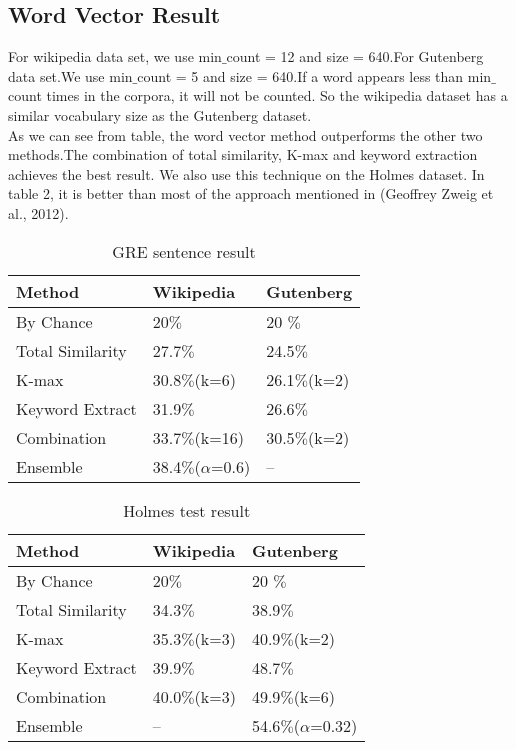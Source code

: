 \documentclass[11pt]{article}
\begin{document}
\subsection{Word Vector Result}
For wikipedia data set, we use min$\_$count = 12 and size = 640.For Gutenberg data set.We use min$\_$count = 5 and size = 640.If a word appears less than min$\_$count times in the corpora, it will not be counted. So the wikipedia dataset has a similar vocabulary size as the Gutenberg dataset.\\
As we can see from table, the word vector method outperforms the other two methods.The combination of total similarity, K-max and keyword extraction achieves the best result. We also use this technique on the Holmes dataset. In table 2, it is better than most of the approach mentioned in (Geoffrey Zweig et al., 2012).
\begin{table}[h]
\begin{center}
\begin{tabular}[bottom]{|l | l | l |}
\hline
\bf Method & \bf Wikipedia & \bf Gutenberg \\ \hline
By Chance & 20$\%$ & 20 $\%$ \\\hline
Total Similarity & 27.7$\%$ & 24.5$\%$ \\\hline
K-max & 30.8$\%$(k=6) & 26.1$\%$(k=2) \\\hline
Keyword Extract& 31.9$\%$ & 26.6$\%$\\\hline
Combination & 33.7$\%$(k=16) & 30.5$\%$(k=2)\\\hline
Ensemble & 38.4$\%$($\alpha$=0.6)  & --\\\hline
\end{tabular}
\end{center}
\caption{\label{font-table} GRE sentence result }
\end{table}
\begin{table}[h]
\begin{center}
\begin{tabular}[bottom]{|l | l | l |}
\hline
\bf Method & \bf Wikipedia & \bf Gutenberg \\ \hline
By Chance & 20$\%$ & 20 $\%$ \\\hline
Total Similarity & 34.3$\%$ & 38.9$\%$ \\\hline
K-max & 35.3$\%$(k=3) & 40.9$\%$(k=2) \\\hline
Keyword Extract& 39.9$\%$ & 48.7$\%$\\\hline
Combination & 40.0$\%$(k=3) & 49.9$\%$(k=6)\\\hline
Ensemble & -- & 54.6$\%$($\alpha$=0.32)  \\\hline
\end{tabular}
\end{center}
\caption{\label{font-table} Holmes test result }
\end{table}
\end{document}
